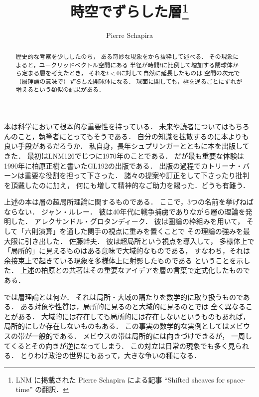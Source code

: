 \documentclass[11pt, a4paper, dvipdfmx]{jlreq}
\theoremstyle{definition}
\theoremstyle{mystyle}
\numberwithin{equation}{section} %
\begin{document}
\title{時空でずらした層\footnote{
    LNM
    に掲載された
    Pierre Schapira による記事 ``Shifted sheaves for space-time'' の翻訳．
}}
\author{Pierre Schapira}
\date{}
\maketitle
\begin{abstract}
    歴史的な考察を少ししたのち，
    ある奇妙な現象を\cite{GKS12}から抜粋して述べる．
    その現象によると，ユークリッドベクトル空間にある
    半径が時間$t$に比例して増加する閉球体から定まる層を考えたとき，
    それを$t<0$に対して自然に延長したものは
    空間の次元で（層理論の意味で）\emph{ずらした}開球体になる．
    球面に関しても，極を通るごとにずれが増えるという類似の結果がある．
\end{abstract}

本は科学において根本的な重要性を持っている．
未来や読者についてはもちろんのこと，執筆者にとってもそうである．
自分の知識を拡散するのに本よりも良い手段があるだろうか．
私自身，長年シュプリンガーとともに本を出版してきた．
最初はLNM126でじつに1970年のことである．
だが最も重要な体験は1990年に柏原正樹と書いたGL192の出版である．
出版の過程でカトリーナ・バーンは重要な役割を担って下さった．
諸々の提案や訂正をして下さったり批判を頂戴したのに加え，
何にも増して精神的なご助力を賜った．どうも有難う．

上述の本は層の超局所理論に関するものである．
ここで，3つの名前を挙げねばならない．
ジャン・ルレー．
彼は40年代に戦争捕虜でありながら層の理論を発明した．
アレクサンドル・グロタンディーク．
彼は圏論の枠組みを用いて，
そして「六則演算」を通した関手の視点に重みを置くことで
その理論の強みを最大限に引き出した．
佐藤幹夫．
彼は超局所という視点を導入して，
多様体上で「局所的」に見えるものはある意味で大域的なものである，
すなわち，それは余接束上で起きている現象を多様体上に射影したものである
ということを示した．
上述の柏原との共著はその重要なアイデアを層の言葉で定式化したものである．

では層理論とは何か．
それは局所・大域の隔たりを数学的に取り扱うものである．
ある対象や性質は，局所的に見るのと大域的に見るのとでは
全く異なることがある．
大域的には存在しても局所的には存在しないというものもあれば，
局所的にしか存在しないものもある．
この事実の数学的な実例としてはメビウスの帯が一般的である．
メビウスの帯は局所的には向きづけできるが，
一周してくるとその向きが逆になってしまう．
この対立は日常の現象でも多く見られる．
とりわけ政治の世界にもあって，大きな争いの種になる．
\end{document}

